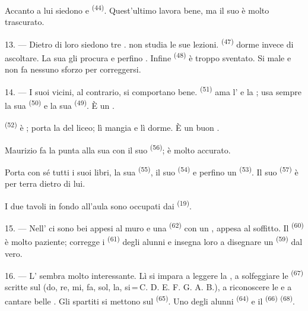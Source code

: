 Accanto a lui siedono  e  \textsuperscript{(44)}.
Quest'ultimo lavora bene, ma il suo  è molto trascurato.

13. --- Dietro di loro siedono tre .  non studia le sue
lezioni.  \textsuperscript{(47)} dorme invece di ascoltare. La sua
 gli procura  e perfino . Infine
 \textsuperscript{(48)} è troppo sventato. Si  male
e non fa nessuno sforzo per correggersi.

14. --- I suoi vicini, al contrario, si comportano bene. 
\textsuperscript{(51)} ama l' e la ; usa sempre la sua
 \textsuperscript{(50)} e la sua  \textsuperscript{(49)}.
È un .

 \textsuperscript{(52)} è ; porta la
 del liceo; lì mangia e lì dorme. È un buon .

Maurizio fa la punta alla sua  con il suo 
\textsuperscript{(56)}; è molto accurato.

Porta con sé tutti i suoi libri, la sua  \textsuperscript{(55)}, il
suo  \textsuperscript{(54)} e perfino un 
\textsuperscript{(53)}. Il suo  \textsuperscript{(57)} è per terra
dietro di lui.

I due tavoli in fondo all'aula sono occupati dai 
\textsuperscript{(19)}.

\VUsaut{4.6mm}
\VUsaut{3.4mm}

15. --- Nell' ci sono bei  appesi al muro e
una  \textsuperscript{(62)} con un , appesa al
soffitto. Il  \textsuperscript{(60)} è molto paziente; corregge i
 \textsuperscript{(61)} degli alunni e insegna loro a disegnare un
 \textsuperscript{(59)} dal vero.

16. --- L' sembra molto interessante. Lì si impara a leggere
la , a solfeggiare le 
\textsuperscript{(67)} scritte sul  (do, re, mi, fa, sol, la,
si\,=\,C. D. E. F. G. A. B.), a riconoscere le  e a cantare belle
. Gli spartiti si mettono sul 
\textsuperscript{(65)}. Uno degli alunni 
\textsuperscript{(64)} e il  \textsuperscript{(66)}
 \textsuperscript{(68)}.

